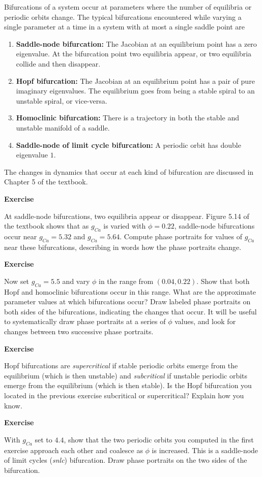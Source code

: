 \documentclass [11pt]{article}
\newcounter{exercise}
\numberwithin{exercise}{section}
\newcommand{\exnumber}{\addtocounter{exercise}{1} \theexercise \thinspace}
\begin{document}
Bifurcations of a system occur at parameters where the number of equilibria or periodic orbits 
change. The typical bifurcations encountered while varying a single parameter at a time in
a system with at most a single saddle point are 
\begin{enumerate}
\item
{\bf Saddle-node bifurcation:} The Jacobian at an equilibrium point 
has a zero eigenvalue. At the bifurcation point two equilibria appear, or
two equilibria collide and then disappear. 
\item
{\bf Hopf bifurcation:} The Jacobian at an equilibrium point has a pair 
of pure imaginary eigenvalues. The equilibrium goes from being a stable spiral
to an unstable spiral, or vice-versa. 
\item
{\bf Homoclinic bifurcation:} There is a trajectory in both the stable 
and unstable manifold of a saddle.
\item
{\bf Saddle-node of limit cycle bifurcation:} A periodic orbit has 
double eigenvalue $1$.
\end{enumerate}
The changes in dynamics that occur at each kind of bifurcation are discussed in
Chapter 5 of the textbook. 

{\bf Exercise \exnumber} At saddle-node bifurcations, two equilibria appear or disappear.
Figure 5.14 of the textbook shows that as $g_{Ca}$ is varied with $\phi=0.22$, saddle-node bifurcations 
occur near $g_{Ca} = 5.32$ and $g_{Ca} = 5.64$. Compute phase portraits for values of 
$g_{Ca}$ near these bifurcations, describing in words how the phase portraits change.

{\bf Exercise \exnumber} Now set $g_{Ca} = 5.5$ and vary $\phi$ in the range from $(0.04,0.22)$.
Show that both Hopf and homoclinic bifurcations occur in this range. What are the approximate
parameter values at which bifurcations occur? Draw labeled phase portraits on both sides of the 
bifurcations, indicating the changes that occur. It will be useful to systematically draw phase
portraits at a series of $\phi$ values, and look for changes between two successive phase portraits. 

{\bf Exercise \exnumber} Hopf bifurcations are {\it supercritical} if stable periodic orbits
emerge from the equilibrium (which is then unstable) and {\it subcritical} if unstable periodic orbits
emerge from the equilibrium (which is then stable). Is the Hopf bifurcation you located in the previous exercise subcritical or supercritical? Explain how you know.

{\bf Exercise \exnumber} With $g_{Ca}$ set to $4.4$, show that the two periodic orbits you computed
in the first exercise approach each other and coalesce as $\phi$ is increased. This is a saddle-node 
of limit cycles (\textit{snlc}) bifurcation. Draw phase portraits on the two sides of the bifurcation.
\end{document}
